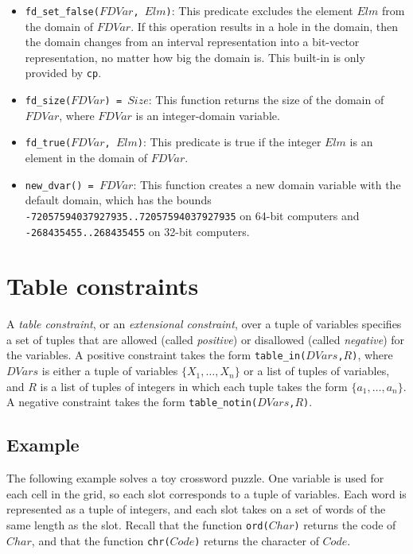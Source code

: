 \begin{itemize}
\item \texttt{fd\_set\_false($FDVar$, $Elm$)}: This predicate excludes the element $Elm$ from the domain of $FDVar$. If this operation results in a hole in the domain, then the domain changes from an interval representation into a bit-vector representation, no matter how big the domain is. This built-in is only provided by {\tt cp}.
\item \texttt{fd\_size($FDVar$) = $Size$}: This function returns the size of the domain of $FDVar$,  where $FDVar$ is an integer-domain variable.
\item \texttt{fd\_true($FDVar$, $Elm$)}: This predicate is true if the integer $Elm$ is an element in the domain of $FDVar$.
\item \texttt{new\_dvar() = $FDVar$}: This function creates a new domain variable with the default domain, which has the bounds \texttt{-72057594037927935..72057594037927935} on 64-bit computers and \texttt{-268435455..268435455} on 32-bit computers.
\end{itemize}

\section{Table constraints}
A \emph{table constraint}, or an \emph{extensional constraint}, over a tuple of variables specifies a set of tuples that are allowed (called \emph{positive}) or disallowed (called \emph{negative}) for the variables. A positive constraint takes the form \texttt{table\_in($DVars$,$R$)}, where $DVars$ is either a tuple of variables $\{X_1,\ldots,X_n\}$ or a list of tuples of variables, and $R$ is a list of tuples of integers in which each tuple takes the form $\{a_1,\ldots,a_n\}$.  A negative constraint takes the form \texttt{table\_notin($DVars$,$R$)}.

\subsection*{Example}
The following example solves a toy crossword puzzle. One variable is used for each cell in the grid, so each slot corresponds to a tuple of variables. Each word is represented as a tuple of integers, and each slot takes on a set of words of the same length as the slot. Recall that the function \texttt{ord($Char$)} returns the code of $Char$, and that the function \texttt{chr($Code$)} returns the character of $Code$.

